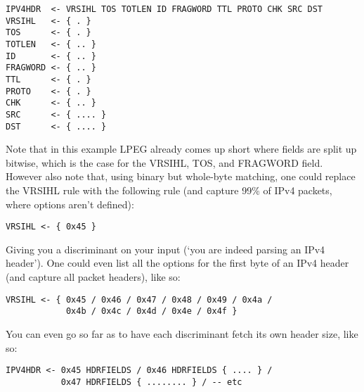 \begin{changemargin}{-60mm}{0mm}
\begin{myquote}
\begin{verbatim}
IPV4HDR  <- VRSIHL TOS TOTLEN ID FRAGWORD TTL PROTO CHK SRC DST
VRSIHL   <- { . }
TOS      <- { . }
TOTLEN   <- { .. }
ID       <- { .. }
FRAGWORD <- { .. }
TTL      <- { . }
PROTO    <- { . }
CHK      <- { .. }
SRC      <- { .... }
DST      <- { .... }
\end{verbatim}
\end{myquote}
\end{changemargin}

Note that in this example LPEG already comes up short where fields are 
split up bitwise, which is the case for the VRSIHL, TOS, and FRAGWORD 
field. However also note that, using binary but whole-byte matching, one 
could replace the VRSIHL rule with the following rule (and capture 99\% of 
IPv4 packets, where options aren’t defined):

\begin{changemargin}{-60mm}{0mm}
\begin{myquote}
\begin{verbatim}
VRSIHL <- { 0x45 }
\end{verbatim}
\end{myquote}
\end{changemargin}

Giving you a discriminant on your input (‘you are indeed parsing an IPv4 
header’). One could even list all the options for the first byte of an 
IPv4 header (and capture all packet headers), like so:

\begin{changemargin}{-60mm}{0mm}
\begin{myquote}
\begin{verbatim}
VRSIHL <- { 0x45 / 0x46 / 0x47 / 0x48 / 0x49 / 0x4a /
            0x4b / 0x4c / 0x4d / 0x4e / 0x4f }
\end{verbatim}
\end{myquote}
\end{changemargin}

You can even go so far as to have each discriminant fetch its own header 
size, like so:

\begin{changemargin}{-60mm}{0mm}
\begin{myquote}
\begin{verbatim}
IPV4HDR <- 0x45 HDRFIELDS / 0x46 HDRFIELDS { .... } /
           0x47 HDRFIELDS { ........ } / -- etc
\end{verbatim}
\end{myquote}
\end{changemargin}

